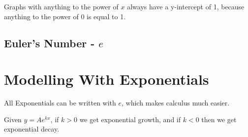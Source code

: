 Graphs with anything to the power of \(x\) always have a y-intercept of 1, because anything to the power of 0 is equal to 1.


\subsection{Euler's Number - \(e\)}

\section{Modelling With Exponentials}
All Exponentials can be written with \(e\), which makes calculus much easier.

Given \(y = Ae^{kx}\), if \(k > 0\) we get exponential growth, and if \(k < 0\) then we get exponential decay.

